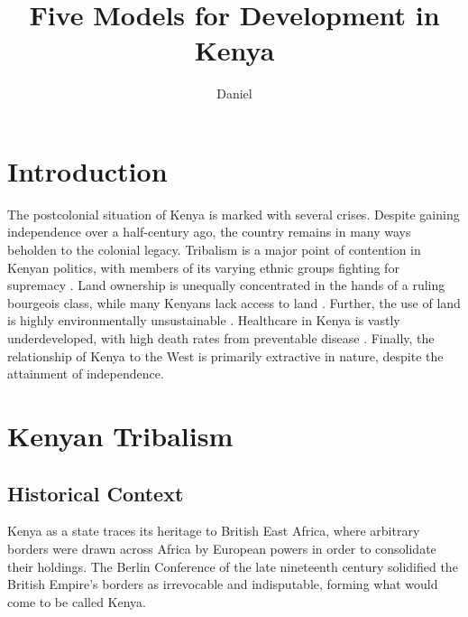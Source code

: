 \documentclass[american]{../../../coursework}
\title{Five Models for Development in Kenya}
\subtitle{}
\author{Daniel}{Glenn}{Leonard}
\date{\DTMUsedate{date}}
\begin{document}
\maketitle


\section{Introduction}

The postcolonial situation of Kenya is marked with several crises. Despite
gaining independence over a half-century ago, the country remains in many ways
beholden to the colonial legacy. Tribalism is a major point of contention in
Kenyan politics, with members of its varying ethnic groups fighting for
supremacy \parencite{Orvis2001}. Land ownership is unequally concentrated in
the hands of a ruling bourgeois class, while many Kenyans lack access to land
\parencite{Syagga2006}. Further, the use of land is highly environmentally
unsustainable \parencite{Syagga2006}. Healthcare in Kenya is vastly
underdeveloped, with high death rates from preventable disease
\parencite{Feikin2011}. Finally, the relationship of Kenya to the West is
primarily extractive in nature, despite the attainment of independence.

\section{Kenyan Tribalism}
\subsection{Historical Context}

Kenya as a state traces its heritage to British East Africa, where arbitrary
borders were drawn across Africa by European powers in order to consolidate
their holdings. The Berlin Conference of the late nineteenth century
solidified the British Empire's borders as irrevocable and indisputable,
forming what would come to be called Kenya.
\end{document}
